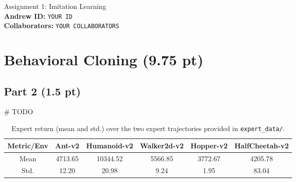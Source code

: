\documentclass{article}
\begin{document}

\begin{centering}
    {\Large Assignment 1: Imitation Learning} \\
    \vspace{.25cm}
    \textbf{Andrew ID:} \texttt{YOUR ID} \\
    \textbf{Collaborators:} \texttt{YOUR COLLABORATORS}\\ 
\end{centering}

\vspace{.5cm}

\section{Behavioral Cloning (9.75 pt)}
\subsection{Part 2 (1.5 pt)}
\# TODO
\begin{table}[!h]
  \centering
  \caption{Expert return (mean and std.) over the two expert trajectories provided in \texttt{expert\_data/}.}
    \begin{tabular}{cccccc}
    \toprule[1.0pt]
    Metric/Env & Ant-v2 & Humanoid-v2 & Walker2d-v2 & Hopper-v2 & HalfCheetah-v2 \\
    \midrule
    Mean  & 4713.65 & 10344.52 & 5566.85 & 3772.67 & 4205.78 \\
    Std.  & 12.20 & 20.98 & 9.24 & 1.95 & 83.04 \\
    \bottomrule[1.0pt]
    \end{tabular}%
  \label{tab:p2}%
\end{table}%
\end{document}
